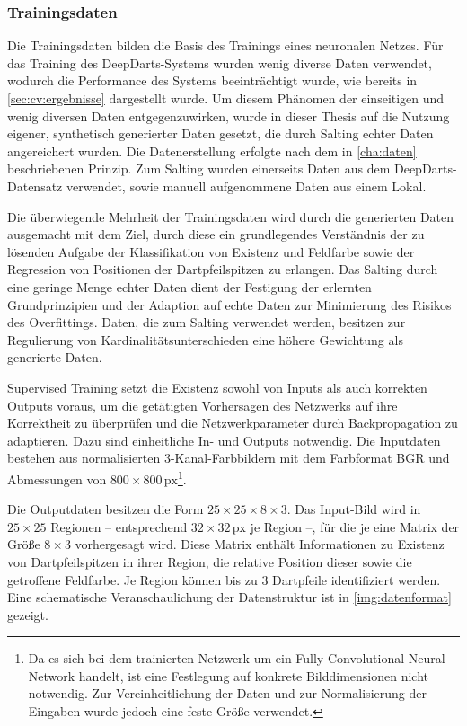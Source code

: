 \subsubsection{Trainingsdaten}
\label{sec:trainingsdaten}

Die Trainingsdaten bilden die Basis des Trainings eines neuronalen Netzes. Für das Training des DeepDarts-Systems wurden wenig diverse Daten verwendet, wodurch die Performance des Systems beeinträchtigt wurde, wie bereits in \autoref{sec:cv:ergebnisse} dargestellt wurde. Um diesem Phänomen der einseitigen und wenig diversen Daten entgegenzuwirken, wurde in dieser Thesis auf die Nutzung eigener, synthetisch generierter Daten gesetzt, die durch Salting echter Daten angereichert wurden. Die Datenerstellung erfolgte nach dem in \autoref{cha:daten} beschriebenen Prinzip. Zum Salting wurden einerseits Daten aus dem DeepDarts-Datensatz verwendet, sowie manuell aufgenommene Daten aus einem Lokal.

Die überwiegende Mehrheit der Trainingsdaten wird durch die generierten Daten ausgemacht mit dem Ziel, durch diese ein grundlegendes Verständnis der zu lösenden Aufgabe der Klassifikation von Existenz und Feldfarbe sowie der Regression von Positionen der Dartpfeilspitzen zu erlangen. Das Salting durch eine geringe Menge echter Daten dient der Festigung der erlernten Grundprinzipien und der Adaption auf echte Daten zur Minimierung des Risikos des Overfittings. Daten, die zum Salting verwendet werden, besitzen zur Regulierung von Kardinalitätsunterschieden eine höhere Gewichtung als generierte Daten.

Supervised Training setzt die Existenz sowohl von Inputs als auch korrekten Outputs voraus, um die getätigten Vorhersagen des Netzwerks auf ihre Korrektheit zu überprüfen und die Netzwerkparameter durch Backpropagation zu adaptieren. Dazu sind einheitliche In- und Outputs notwendig. Die Inputdaten bestehen aus normalisierten 3-Kanal-Farbbildern mit dem Farbformat BGR und Abmessungen von $800 \times 800\,\text{px}$\footnote{Da es sich bei dem trainierten Netzwerk um ein Fully Convolutional Neural Network handelt, ist eine Festlegung auf konkrete Bilddimensionen nicht notwendig. Zur Vereinheitlichung der Daten und zur Normalisierung der Eingaben wurde jedoch eine feste Größe verwendet.}.

Die Outputdaten besitzen die Form $25 \times 25 \times 8 \times 3$. Das Input-Bild wird in $25 \times 25$ Regionen -- entsprechend $32 \times 32\,\text{px}$ je Region --, für die je eine Matrix der Größe $8 \times 3$ vorhergesagt wird. Diese Matrix enthält Informationen zu Existenz von Dartpfeilspitzen in ihrer Region, die relative Position dieser sowie die getroffene Feldfarbe. Je Region können bis zu 3 Dartpfeile identifiziert werden. Eine schematische Veranschaulichung der Datenstruktur ist in \autoref{img:datenformat} gezeigt.

